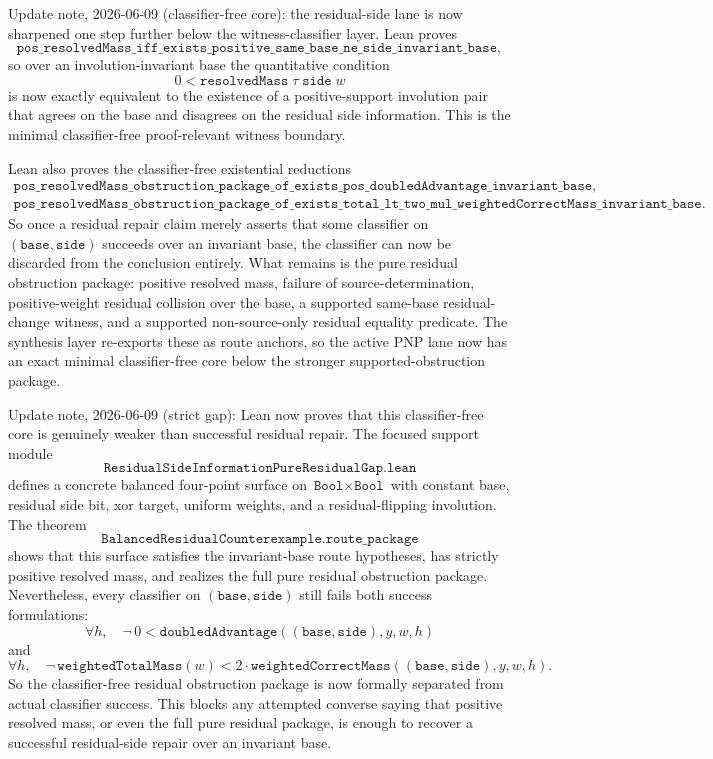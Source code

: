 \documentclass[11pt]{article}
\theoremstyle{remark}
\begin{document}
Update note, 2026-06-09 (classifier-free core): the residual-side lane is now
sharpened one step further below the witness-classifier layer.  Lean proves
\[
\texttt{pos\_resolvedMass\_iff\_exists\_positive\_same\_base\_ne\_side\_invariant\_base},
\]
so over an involution-invariant base the quantitative condition
\[
0 < \texttt{resolvedMass}\;\tau\;\texttt{side}\;w
\]
is now exactly equivalent to the existence of a positive-support involution
pair that agrees on the base and disagrees on the residual side information.
This is the minimal classifier-free proof-relevant witness boundary.

Lean also proves the classifier-free existential reductions
\[
\begin{gathered}
\texttt{pos\_resolvedMass\_obstruction\_package\_of\_exists\_pos\_doubledAdvantage\_invariant\_base},\\
\texttt{pos\_resolvedMass\_obstruction\_package\_of\_exists\_total\_lt\_two\_mul\_weightedCorrectMass\_invariant\_base}.
\end{gathered}
\]
So once a residual repair claim merely asserts that some classifier on
\((\texttt{base},\texttt{side})\) succeeds over an invariant base, the
classifier can now be discarded from the conclusion entirely.  What remains is
the pure residual obstruction package: positive resolved mass, failure of
source-determination, positive-weight residual collision over the base, a
supported same-base residual-change witness, and a supported non-source-only
residual equality predicate.  The synthesis layer re-exports these as route
anchors, so the active PNP lane now has an exact minimal classifier-free core
below the stronger supported-obstruction package.

Update note, 2026-06-09 (strict gap): Lean now proves that this classifier-free
core is genuinely weaker than successful residual repair.  The focused support
module
\[
\texttt{ResidualSideInformationPureResidualGap.lean}
\]
defines a concrete balanced four-point surface on \(\texttt{Bool} \times
\texttt{Bool}\) with constant base, residual side bit, xor target, uniform
weights, and a residual-flipping involution.  The theorem
\[
\texttt{BalancedResidualCounterexample.route\_package}
\]
shows that this surface satisfies the invariant-base route hypotheses, has
strictly positive resolved mass, and realizes the full pure residual
obstruction package.  Nevertheless, every classifier on
\((\texttt{base},\texttt{side})\) still fails both success formulations:
\[
\forall h,\quad
\neg\, 0 < \texttt{doubledAdvantage}((\texttt{base},\texttt{side}),y,w,h)
\]
and
\[
\forall h,\quad
\neg\, \texttt{weightedTotalMass}(w) <
2 \cdot \texttt{weightedCorrectMass}((\texttt{base},\texttt{side}),y,w,h).
\]
So the classifier-free residual obstruction package is now formally separated
from actual classifier success.  This blocks any attempted converse saying that
positive resolved mass, or even the full pure residual package, is enough to
recover a successful residual-side repair over an invariant base.
\end{document}
